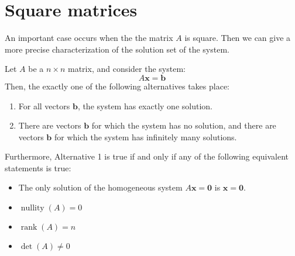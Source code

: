 \documentclass[12pt]{article}
\DeclareMathOperator{\rank}{rank}
\DeclareMathOperator{\nullity}{nullity}
\begin{document}
\section{Square matrices}

An important case occurs when the the matrix $A$ is square. Then we can give a more precise characterization of the solution set of the system.

\begin{theorem} Let $A$ be a $n\times n$ matrix, and consider the system:
\[
A\mathbf{x}=\mathbf{b}
\]
Then, the exactly one of the following alternatives takes place:
\begin{enumerate}
\item For all vectors $\mathbf{b}$, the system has exactly one solution.
\item There are vectors $\mathbf{b}$ for which the system has no solution, and there are vectors $\mathbf{b}$ for which the system has infinitely many solutions.
\end{enumerate}
Furthermore, Alternative 1 is true if and only if any of the following equivalent statements is true:
\begin{itemize}
\item The only solution of the homogeneous system $A\mathbf{x}=\mathbf{0}$ is $\mathbf{x}=\mathbf{0}$.
\item $\nullity(A)=0$
\item $\rank(A)=n$
\item $\det(A)\ne 0$
\end{itemize}
\end{theorem}
\end{document}
